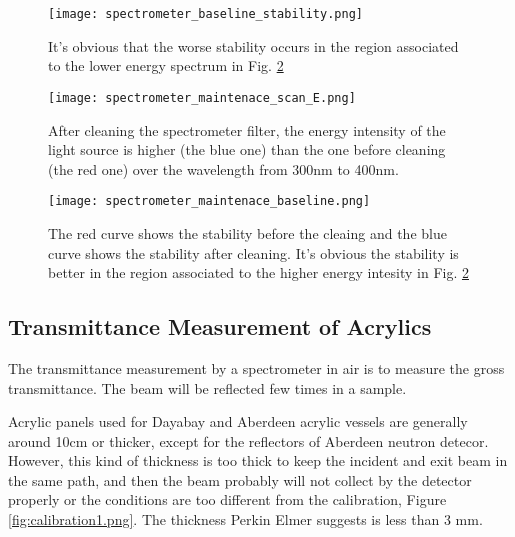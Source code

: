 \begin{figure}
    \centering
    \texttt{[image: spectrometer\_baseline\_stability.png]}
    \caption[The spectrometer baseline stability]
{It's obvious that the worse stability occurs in the region associated to the lower energy spectrum in Fig. \ref{fig:spectrometer_maintenace_scan_E.png}}
    \label{fig:spectrometer_baseline_stability.png}
    \end{figure}


\begin{figure}
    \centering
    \texttt{[image: spectrometer\_maintenace\_scan\_E.png]}
    \caption[The energy spectrum of the light source of Lambda 650]
{
After cleaning the spectrometer filter,
the energy intensity of the light source is higher (the blue one) than the one before cleaning (the red one) over the wavelength from 300nm to 400nm.
}
    \label{fig:spectrometer_maintenace_scan_E.png}
    \end{figure}


\begin{figure}
    \centering
    \texttt{[image: spectrometer\_maintenace\_baseline.png]}
    \caption[The spectrometer baseline stability before and after cleaing the filter]
{
The red curve shows the stability before the cleaing and the blue curve shows the stability after cleaning.
It's obvious the stability is better in the region associated to the higher energy intesity in Fig. \ref{fig:spectrometer_maintenace_scan_E.png}
}
    \label{fig:spectrometer_maintenace_baseline.png}
    \end{figure}




\subsection{Transmittance Measurement of Acrylics}

The transmittance measurement by a spectrometer in air is to measure the gross transmittance.
The beam will be reflected few times in a sample.

Acrylic panels used for Dayabay and Aberdeen acrylic vessels
are generally around 10cm or thicker, except for the reflectors of Aberdeen
neutron detecor. However, this kind of thickness is too thick to
keep the incident and exit beam in the same path, and then
the beam probably will not collect by the detector properly or
the conditions are too different from the calibration, Figure \ref{fig:calibration1.png}.
The thickness Perkin Elmer suggests is less than 3 mm.



